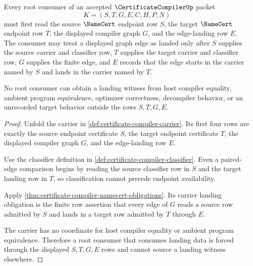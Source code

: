 \begin{theorem}
\label{thm:certificate-compiler-root-landing-obligation}
Every root consumer of an accepted $\CertificateCompilerUp$ packet
$$
K=(S,T,G,E,C,H,P,N)
$$
must first read the source $\NameCert$ endpoint row $S$, the target
$\NameCert$ endpoint row $T$, the displayed compiler graph $G$, and the
edge-landing row $E$. The consumer may treat a displayed graph edge as
landed only after $S$ supplies the source carrier and classifier row, $T$
supplies the target carrier and classifier row, $G$ supplies the finite edge,
and $E$ records that the edge starts in the carrier named by $S$ and lands in
the carrier named by $T$.

No root consumer can obtain a landing witness from host compiler equality,
ambient program equivalence, optimizer correctness, decompiler behavior, or an
unrecorded target behavior outside the rows $S,T,G,E$.
\end{theorem}
\begin{proof}
Unfold the carrier in \autoref{def:certificate-compiler-carrier}. Its first
four rows are exactly the source endpoint certificate $S$, the target endpoint
certificate $T$, the displayed compiler graph $G$, and the edge-landing row
$E$.

Use the classifier definition in
\autoref{def:certificate-compiler-classifier}. Even a paired-edge comparison
begins by reading the source classifier row in $S$ and the target landing row
in $T$, so classification cannot precede endpoint availability.

Apply \autoref{thm:certificate-compiler-namecert-obligations}. Its carrier
landing obligation is the finite row assertion that every edge of $G$ reads a
source row admitted by $S$ and lands in a target row admitted by $T$ through
$E$.

The carrier has no coordinate for host compiler equality or ambient program
equivalence. Therefore a root consumer that consumes landing data is forced
through the displayed $S,T,G,E$ rows and cannot source a landing witness
elsewhere.
\end{proof}

